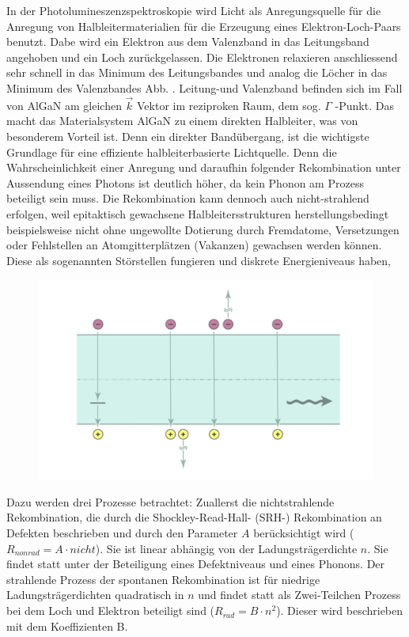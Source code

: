 \raggedright
%
In der Photolumineszenzspektroskopie wird Licht als Anregungsquelle für die Anregung von Halbleitermaterialien für die Erzeugung eines Elektron-Loch-Paars benutzt. Dabe wird ein Elektron aus dem Valenzband in das Leitungsband angehoben und ein Loch zurückgelassen. Die Elektronen relaxieren anschliessend sehr schnell in das Minimum des Leitungsbandes und analog die Löcher in das Minimum des Valenzbandes Abb. . Leitung-und Valenzband befinden sich im Fall von AlGaN am gleichen $\vec{k}$ Vektor im reziproken Raum, dem sog. $\Gamma$ -Punkt. Das macht das Materialsystem AlGaN zu einem direkten Halbleiter, was von besonderem Vorteil ist. Denn ein direkter Bandübergang, ist die wichtigste Grundlage für eine effiziente halbleiterbasierte Lichtquelle. Denn die Wahrscheinlichkeit einer Anregung und daraufhin folgender Rekombination unter Aussendung eines Photons ist deutlich höher, da kein Phonon am Prozess beteiligt sein muss. 
Die Rekombination kann dennoch auch nicht-strahlend erfolgen, weil epitaktisch gewachsene Halbleitersstrukturen herstellungsbedingt beispielsweise nicht ohne ungewollte Dotierung durch Fremdatome, Versetzungen oder Fehlstellen an Atomgitterplätzen (Vakanzen) gewachsen werden können. Diese als sogenannten Störstellen fungieren und diskrete Energieniveaus haben, 
%
\begin{figure}[h]
    \centering
    \begin{minipage}[t]{0.5\linewidth}
        \centering
        \includegraphics[width=\linewidth]{Bilder/rekbomChannels.png}
        \caption{}
        \label{fig:rekombChannels}
    \end{minipage}%
\end{figure}
\raggedright
%
Dazu werden drei Prozesse betrachtet: Zuallerst die nichtstrahlende Rekombination, die durch die Shockley-Read-Hall- (SRH-) Rekombination an Defekten beschrieben und durch den Parameter $A$ berücksichtigt wird ($R_{nonrad} = A \cdot nicht $). Sie ist linear abhängig von der Ladungsträgerdichte $n$. Sie findet statt unter der Beteiligung eines Defektniveaus und eines Phonons. Der strahlende Prozess der spontanen Rekombination ist für niedrige Ladungsträgerdichten quadratisch in $n$ und findet statt als Zwei-Teilchen Prozess bei dem Loch und Elektron beteiligt sind ($R_{rad} = B \cdot n^2 $). Dieser wird beschrieben mit dem Koeffizienten B. 
